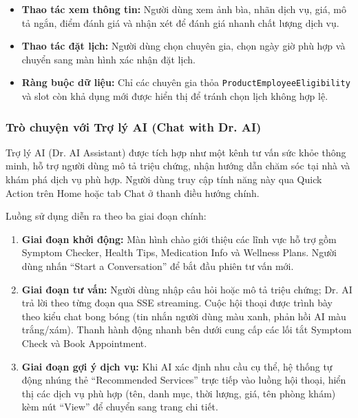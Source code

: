 \begin{itemize}
    \item \textbf{Thao tác xem thông tin:} Người dùng xem ảnh bìa, nhãn dịch vụ, giá, mô tả ngắn, điểm đánh giá và nhận xét để đánh giá nhanh chất lượng dịch vụ.
    \item \textbf{Thao tác đặt lịch:} Người dùng chọn chuyên gia, chọn ngày giờ phù hợp và chuyển sang màn hình xác nhận đặt lịch.
    \item \textbf{Ràng buộc dữ liệu:} Chỉ các chuyên gia thỏa \texttt{ProductEmployeeEligibility} và slot còn khả dụng mới được hiển thị để tránh chọn lịch không hợp lệ.
\end{itemize}

\subsubsection{Trò chuyện với Trợ lý AI (Chat with Dr. AI)}

Trợ lý AI (Dr. AI Assistant) được tích hợp như một kênh tư vấn sức khỏe thông minh, hỗ trợ người dùng mô tả triệu chứng, nhận hướng dẫn chăm sóc tại nhà và khám phá dịch vụ phù hợp. Người dùng truy cập tính năng này qua Quick Action trên Home hoặc tab Chat ở thanh điều hướng chính.

Luồng sử dụng diễn ra theo ba giai đoạn chính:

\begin{enumerate}
    \item \textbf{Giai đoạn khởi động:} Màn hình chào giới thiệu các lĩnh vực hỗ trợ gồm Symptom Checker, Health Tips, Medication Info và Wellness Plans. Người dùng nhấn ``Start a Conversation'' để bắt đầu phiên tư vấn mới.
    \item \textbf{Giai đoạn tư vấn:} Người dùng nhập câu hỏi hoặc mô tả triệu chứng; Dr. AI trả lời theo từng đoạn qua SSE streaming. Cuộc hội thoại được trình bày theo kiểu chat bong bóng (tin nhắn người dùng màu xanh, phản hồi AI màu trắng/xám). Thanh hành động nhanh bên dưới cung cấp các lối tắt Symptom Check và Book Appointment.
    \item \textbf{Giai đoạn gợi ý dịch vụ:} Khi AI xác định nhu cầu cụ thể, hệ thống tự động nhúng thẻ ``Recommended Services'' trực tiếp vào luồng hội thoại, hiển thị các dịch vụ phù hợp (tên, danh mục, thời lượng, giá, tên phòng khám) kèm nút ``View'' để chuyển sang trang chi tiết.
\end{enumerate}

